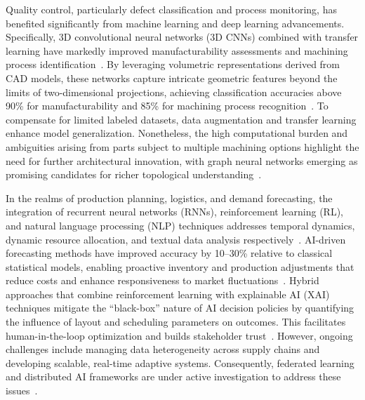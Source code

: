 \documentclass[sigconf]{acmart}
\begin{document}
Quality control, particularly defect classification and process monitoring, has benefited significantly from machine learning and deep learning advancements. Specifically, 3D convolutional neural networks (3D CNNs) combined with transfer learning have markedly improved manufacturability assessments and machining process identification~\cite{ref39}. By leveraging volumetric representations derived from CAD models, these networks capture intricate geometric features beyond the limits of two-dimensional projections, achieving classification accuracies above 90\% for manufacturability and 85\% for machining process recognition~\cite{ref39}. To compensate for limited labeled datasets, data augmentation and transfer learning enhance model generalization. Nonetheless, the high computational burden and ambiguities arising from parts subject to multiple machining options highlight the need for further architectural innovation, with graph neural networks emerging as promising candidates for richer topological understanding~\cite{ref39}.

In the realms of production planning, logistics, and demand forecasting, the integration of recurrent neural networks (RNNs), reinforcement learning (RL), and natural language processing (NLP) techniques addresses temporal dynamics, dynamic resource allocation, and textual data analysis respectively~\cite{ref40}. AI-driven forecasting methods have improved accuracy by 10–30\% relative to classical statistical models, enabling proactive inventory and production adjustments that reduce costs and enhance responsiveness to market fluctuations~\cite{ref40,ref45}. Hybrid approaches that combine reinforcement learning with explainable AI (XAI) techniques mitigate the “black-box” nature of AI decision policies by quantifying the influence of layout and scheduling parameters on outcomes. This facilitates human-in-the-loop optimization and builds stakeholder trust~\cite{ref45}. However, ongoing challenges include managing data heterogeneity across supply chains and developing scalable, real-time adaptive systems. Consequently, federated learning and distributed AI frameworks are under active investigation to address these issues~\cite{ref40}.
\end{document}
